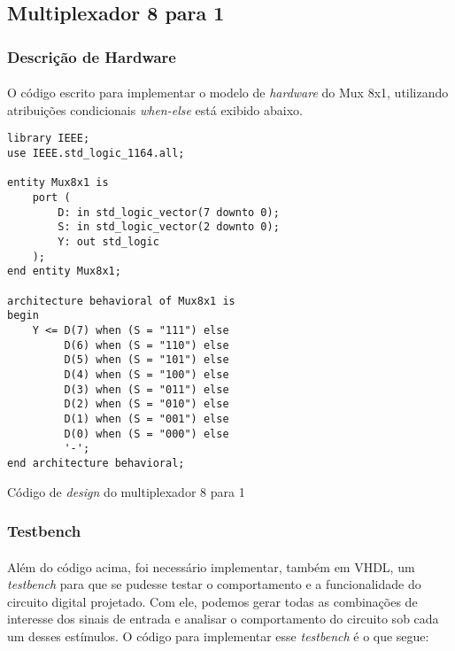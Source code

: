 \documentclass[a4paper,12pt]{article}
\newenvironment{code}{\captionsetup{type=listing}}{}
\begin{document}
\subsection{Multiplexador 8 para 1}

\subsubsection{Descrição de Hardware}
\paragraph{}
O código escrito para implementar o modelo de \textit{hardware} do Mux 8x1, utilizando atribuições condicionais \textit{when-else} está exibido abaixo.

\begin{code}
\begin{verbatim}
library IEEE;
use IEEE.std_logic_1164.all;

entity Mux8x1 is
    port (
        D: in std_logic_vector(7 downto 0);
        S: in std_logic_vector(2 downto 0);
        Y: out std_logic
    );
end entity Mux8x1;

architecture behavioral of Mux8x1 is
begin
    Y <= D(7) when (S = "111") else
         D(6) when (S = "110") else
         D(5) when (S = "101") else
         D(4) when (S = "100") else
         D(3) when (S = "011") else
         D(2) when (S = "010") else
         D(1) when (S = "001") else
         D(0) when (S = "000") else
         '-';    
end architecture behavioral;
\end{verbatim}
\caption{Código de \textit{design} do multiplexador 8 para 1}
\end{code}

\subsubsection{Testbench}
\paragraph{}
Além do código acima, foi necessário implementar, também em VHDL, um \textit{testbench} para que se pudesse testar o comportamento e a funcionalidade do circuito digital projetado. Com ele, podemos gerar todas as combinações de interesse dos sinais de entrada e analisar o comportamento do circuito sob cada um desses estímulos. O código para implementar esse \textit{testbench} é o que segue:
\end{document}
